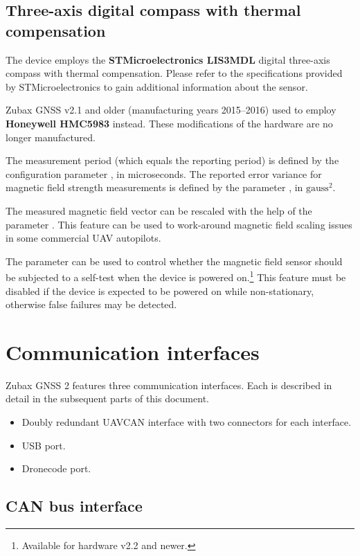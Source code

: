 \documentclass{zubaxdoc}
\begin{document}
\subsection{Three-axis digital compass with thermal compensation}

The device employs the \textbf{STMicroelectronics LIS3MDL} digital three-axis compass with thermal compensation.
Please refer to the specifications provided by STMicroelectronics to gain additional information about the sensor.

Zubax GNSS v2.1 and older (manufacturing years 2015--2016) used to employ \textbf{Honeywell HMC5983} instead.
These modifications of the hardware are no longer manufactured.

The measurement period (which equals the reporting period) is defined by the configuration parameter 
, in microseconds.
The reported error variance for magnetic field strength measurements is defined by the parameter
, in $\text{gauss}^2$.

The measured magnetic field vector can be rescaled with the help of the parameter .
This feature can be used to work-around magnetic field scaling issues in some commercial UAV autopilots.

The parameter  can be used to control whether the magnetic field sensor should be
subjected to a self-test when the device is powered on.\footnote{Available for hardware v2.2 and newer.}
This feature must be disabled if the device is expected to be powered on while non-stationary,
otherwise false failures may be detected.

\section{Communication interfaces}

Zubax GNSS 2 features three communication interfaces. Each is described in detail in the subsequent parts of this document.
\begin {itemize}
\item Doubly redundant UAVCAN interface with two connectors for each interface.
\item USB port.
\item Dronecode port.
\end{itemize}

\subsection{CAN bus interface}
\end{document}
